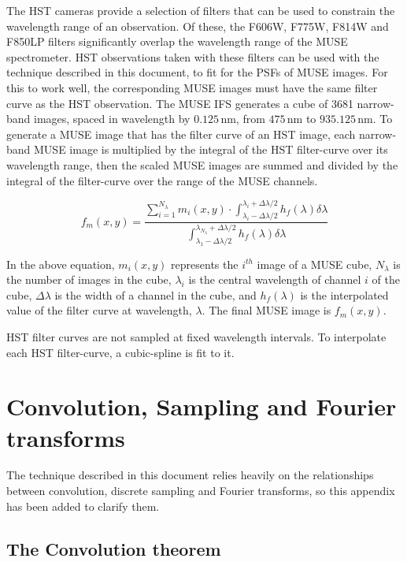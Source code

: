 \documentclass[12pt,twoside,a4paper]{article}
\newcommand{\nm}{\mbox{nm}}
\begin{document}
The HST cameras provide a selection of filters that can be used to
constrain the wavelength range of an observation. Of these, the F606W,
F775W, F814W and F850LP filters significantly overlap the wavelength
range of the MUSE spectrometer. HST observations taken with these
filters can be used with the technique described in this document, to
fit for the PSFs of MUSE images. For this to work well, the
corresponding MUSE images must have the same filter curve as the HST
observation. The MUSE IFS generates a cube of 3681 narrow-band images,
spaced in wavelength by $0.125\,\nm$, from $475\,\nm$ to
$935.125\,\nm$. To generate a MUSE image that has the filter curve of
an HST image, each narrow-band MUSE image is multiplied by the
integral of the HST filter-curve over its wavelength range, then the
scaled MUSE images are summed and divided by the integral of the
filter-curve over the range of the MUSE channels.

\begin{equation}
  f_m(x,y) = \frac{\sum_{i=1}^{N_{\lambda}}
  m_i(x,y)\cdot\int_{\lambda_i-\Delta\lambda/2}^{\lambda_i+\Delta\lambda/2} h_f(\lambda)\delta\lambda}{\int_{\lambda_1-\Delta\lambda/2}^{\lambda_{N_\lambda}+\Delta\lambda/2} h_f(\lambda)\delta\lambda}
\end{equation}

In the above equation, $m_i(x,y)$ represents the $i^{th}$ image of a
MUSE cube, $N_{\lambda}$ is the number of images in the cube,
$\lambda_i$ is the central wavelength of channel $i$ of the cube,
$\Delta\lambda$ is the width of a channel in the cube, and
$h_f(\lambda)$ is the interpolated value of the filter curve at
wavelength, $\lambda$. The final MUSE image is $f_m(x,y)$.

HST filter curves are not sampled at fixed wavelength intervals. To
interpolate each HST filter-curve, a cubic-spline is fit to it.

\appendix
\section{Convolution, Sampling and Fourier transforms}
\label{sampling_appendix}

The technique described in this document relies heavily on the
relationships between convolution, discrete sampling and Fourier
transforms, so this appendix has been added to clarify them.

\subsection{The Convolution theorem}
\end{document}
